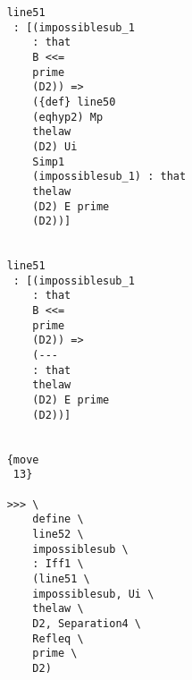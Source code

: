 \documentclass[12pt]{article}
\begin{document}
\begin{verbatim}
                                          line51 
                                           : [(impossiblesub_1 
                                              : that 
                                              B <<= 
                                              prime 
                                              (D2)) => 
                                              ({def} line50 
                                              (eqhyp2) Mp 
                                              thelaw 
                                              (D2) Ui 
                                              Simp1 
                                              (impossiblesub_1) : that 
                                              thelaw 
                                              (D2) E prime 
                                              (D2))]


                                          line51 
                                           : [(impossiblesub_1 
                                              : that 
                                              B <<= 
                                              prime 
                                              (D2)) => 
                                              (--- 
                                              : that 
                                              thelaw 
                                              (D2) E prime 
                                              (D2))]


                                          {move 
                                           13}

                                          >>> \
                                              define \
                                              line52 \
                                              impossiblesub \
                                              : Iff1 \
                                              (line51 \
                                              impossiblesub, Ui \
                                              thelaw \
                                              D2, Separation4 \
                                              Refleq \
                                              prime \
                                              D2)



\end{verbatim}
\end{document}

